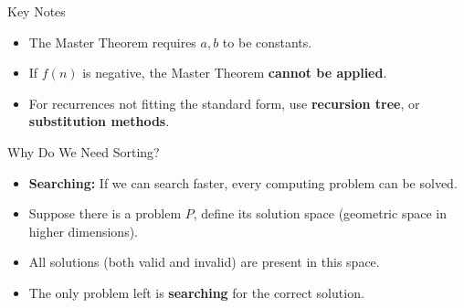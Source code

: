 %
%


\begin{frame}{Key Notes}

\begin{itemize}
    \item The Master Theorem requires \( a, b \) to be constants.
    \item If \( f(n) \) is negative, the Master Theorem \textbf{cannot be applied}.
    \item For recurrences not fitting the standard form, use  \textbf{recursion tree}, or \textbf{substitution methods}.
\end{itemize}
\end{frame}



\begin{frame}{Why Do We Need Sorting?}
\begin{itemize}
    \item \textbf{Searching:} If we can search faster, every computing problem can be solved.
    \item Suppose there is a problem \( P \), define its solution space (geometric space in higher dimensions).
    \item All solutions (both valid and invalid) are present in this space.
    \item The only problem left is \textbf{searching} for the correct solution.
\end{itemize}
\end{frame}


